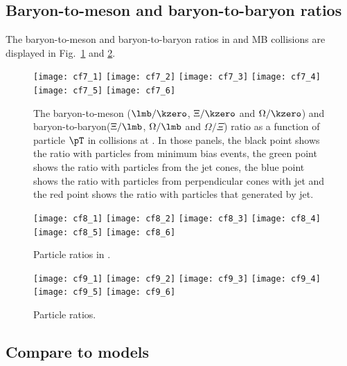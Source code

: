 \subsection{Baryon-to-meson and baryon-to-baryon ratios}
\label{subsec:ParRatios}
The baryon-to-meson and baryon-to-baryon ratios in \pp and MB \pPb collisions are displayed in Fig.~\ref{fig:ppRatio} and \ref{fig:pPbRatio}.

\begin{figure}[!ht]
	\begin{center}
		\texttt{[image: cf7\_1]}
		\texttt{[image: cf7\_2]}
		\texttt{[image: cf7\_3]}
		\texttt{[image: cf7\_4]}
		\texttt{[image: cf7\_5]}
		\texttt{[image: cf7\_6]}
	\end{center}
	\caption{The baryon-to-meson ($\lmb/\kzero$, $\Xi/\kzero$ and $\Omega/\kzero$) and baryon-to-baryon($\Xi/\lmb$, $\Omega/\lmb$ and $\Omega/\Xi$) ratio as a function of particle $\pT$ in \pp collisions at \thirteen. In those panels, the black point shows the ratio with particles from minimum bias events, the green point shows the ratio with particles from the jet cones, the blue point shows the ratio with particles from perpendicular cones with jet and the red point shows the ratio with particles that generated by jet.}
	\label{fig:ppRatio}
\end{figure}
\begin{figure}[!ht]
	\begin{center}
		\texttt{[image: cf8\_1]}
		\texttt{[image: cf8\_2]}
		\texttt{[image: cf8\_3]}
		\texttt{[image: cf8\_4]}
		\texttt{[image: cf8\_5]}
		\texttt{[image: cf8\_6]}
	\end{center}
	\caption{Particle ratios in \pPb.}
	\label{fig:pPbRatio}
\end{figure}
\begin{figure}[!ht]
	\begin{center}
		\texttt{[image: cf9\_1]}
		\texttt{[image: cf9\_2]}
		\texttt{[image: cf9\_3]}
		\texttt{[image: cf9\_4]}
		\texttt{[image: cf9\_5]}
		\texttt{[image: cf9\_6]}
	\end{center}
	\caption{Particle ratios.}
	\label{fig:pppPbRatio}
\end{figure}

\subsection{Compare to models}
\label{subsec:ComToMod}

